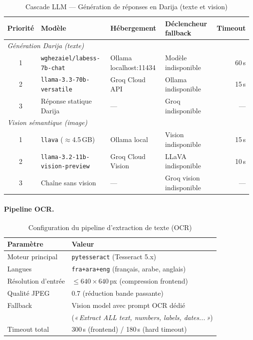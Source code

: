 \begin{table}[H]
\centering
\caption{Cascade LLM --- Génération de réponses en Darija (texte et vision)}
\label{tab:cascade_llm}
\begin{tabular}{clllr}
\toprule
\textbf{Priorité} & \textbf{Modèle} & \textbf{Hébergement} & \textbf{Déclencheur fallback} & \textbf{Timeout} \\
\midrule
\multicolumn{5}{l}{\textit{Génération Darija (texte)}} \\
1 & \texttt{wghezaiel/labess-7b-chat} & Ollama localhost:11434 & Modèle indisponible & 60\,s \\
2 & \texttt{llama-3.3-70b-versatile}  & Groq Cloud API & Ollama indisponible & 15\,s \\
3 & Réponse statique Darija & --- & Groq indisponible & --- \\
\midrule
\multicolumn{5}{l}{\textit{Vision sémantique (image)}} \\
1 & \texttt{llava} ($\approx$4.5\,GB) & Ollama local & Vision indisponible & 15\,s \\
2 & \texttt{llama-3.2-11b-vision-preview} & Groq Cloud Vision & LLaVA indisponible & 10\,s \\
3 & Chaîne sans vision & --- & Groq vision indisponible & --- \\
\bottomrule
\end{tabular}
\end{table}

\paragraph{Pipeline OCR.}

\begin{table}[H]
\centering
\caption{Configuration du pipeline d'extraction de texte (OCR)}
\label{tab:ocr_pipeline}
\begin{tabular}{ll}
\toprule
\textbf{Paramètre} & \textbf{Valeur} \\
\midrule
Moteur principal      & \texttt{pytesseract} (Tesseract 5.x) \\
Langues               & \texttt{fra+ara+eng} (français, arabe, anglais) \\
Résolution d'entrée   & $\leq 640 \times 640$\,px (compression frontend) \\
Qualité JPEG          & 0.7 (réduction bande passante) \\
Fallback              & Vision model avec prompt OCR dédié \\
                      & (\textit{«\,Extract ALL text, numbers, labels, dates...\,»}) \\
Timeout total         & 300\,s (frontend) / 180\,s (hard timeout) \\
\bottomrule
\end{tabular}
\end{table}

